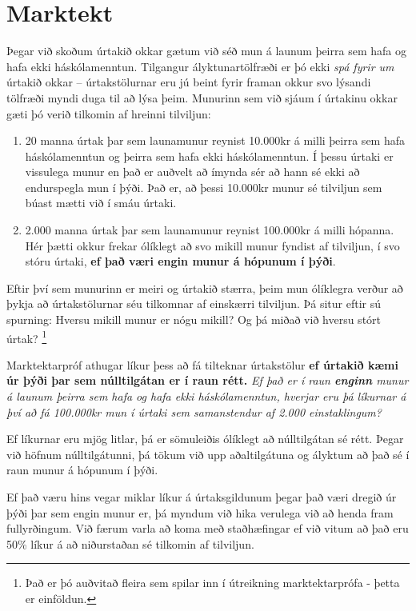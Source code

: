 \documentclass[
]{book}
\begin{document}
\hypertarget{marktekt}{%
\chapter{Marktekt}\label{marktekt}}

Þegar við skoðum úrtakið okkar gætum við séð mun á launum þeirra sem hafa og hafa ekki háskólamenntun. Tilgangur ályktunartölfræði er þó ekki \emph{spá fyrir um} úrtakið okkar -- úrtakstölurnar eru jú beint fyrir framan okkur svo lýsandi tölfræði myndi duga til að lýsa þeim. Munurinn sem við sjáum í úrtakinu okkar gæti þó verið tilkomin af hreinni tilviljun:

\begin{enumerate}
\def\labelenumi{\arabic{enumi}.}
\item
  20 manna úrtak þar sem launamunur reynist 10.000kr á milli þeirra sem hafa háskólamenntun og þeirra sem hafa ekki háskólamenntun. Í þessu úrtaki er vissulega munur en það er auðvelt að ímynda sér að hann sé ekki að endurspegla mun í þýði. Það er, að þessi 10.000kr munur sé tilviljun sem búast mætti við í smáu úrtaki.
\item
  2.000 manna úrtak þar sem launamunur reynist 100.000kr á milli hópanna. Hér þætti okkur frekar ólíklegt að svo mikill munur fyndist af tilviljun, í svo stóru úrtaki, \textbf{ef það væri engin munur á hópunum í þýði}.
\end{enumerate}

Eftir því sem munurinn er meiri og úrtakið stærra, þeim mun ólíklegra verður að þykja að úrtakstölurnar séu tilkomnar af einskærri tilviljun. Þá situr eftir sú spurning: Hversu mikill munur er nógu mikill? Og þá miðað við hversu stórt úrtak? \footnote{Það er þó auðvitað fleira sem spilar inn í útreikning marktektarprófa - þetta er einföldun.}

Marktektarpróf athugar líkur þess að fá tilteknar úrtakstölur \textbf{ef úrtakið kæmi úr þýði þar sem núlltilgátan er í raun rétt.} \emph{Ef það er í raun \textbf{enginn} munur á launum þeirra sem hafa og hafa ekki háskólamenntun, hverjar eru þá líkurnar á því að fá 100.000kr mun í úrtaki sem samanstendur af 2.000 einstaklingum?}

Ef líkurnar eru mjög litlar, þá er sömuleiðis ólíklegt að núlltilgátan sé rétt. Þegar við höfnum núlltilgátunni, þá tökum við upp aðaltilgátuna og ályktum að það sé í raun munur á hópunum í þýði.

Ef það væru hins vegar miklar líkur á úrtaksgildunum þegar það væri dregið úr þýði þar sem engin munur er, þá myndum við hika verulega við að henda fram fullyrðingum. Við færum varla að koma með staðhæfingar ef við vitum að það eru 50\% líkur á að niðurstaðan sé tilkomin af tilviljun.
\end{document}
